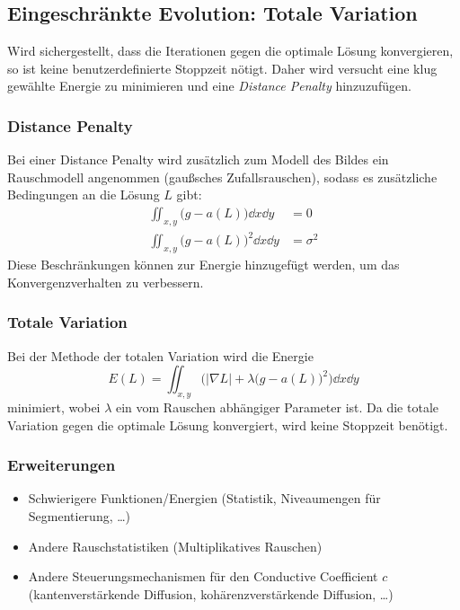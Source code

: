 			\subsection{Eingeschränkte Evolution: Totale Variation}
				Wird sichergestellt, dass die Iterationen gegen die optimale Lösung konvergieren, so ist keine benutzerdefinierte Stoppzeit nötigt. Daher wird versucht eine klug gewählte Energie zu minimieren und eine \emph{Distance Penalty} hinzuzufügen.

				\subsubsection{Distance Penalty}
					Bei einer Distance Penalty wird zusätzlich zum Modell des Bildes ein Rauschmodell angenommen (\zB gaußsches Zufallsrauschen), sodass es zusätzliche Bedingungen an die Lösung \(L\) gibt:
					\begin{align*}
						\iint_{x, y} \! \big( g - a(L) \big) \dd{x} \dd{y}   & = 0        \\
						\iint_{x, y} \! \big( g - a(L) \big)^2 \dd{x} \dd{y} & = \sigma^2
					\end{align*}
					Diese Beschränkungen können zur Energie hinzugefügt werden, um das Konvergenzverhalten zu verbessern.

				\subsubsection{Totale Variation}
					Bei der Methode der totalen Variation wird die Energie
					\begin{equation*}
						E(L) = \iint_{x, y} \! \Big( \lvert \nabla L \rvert + \lambda\big( g - a(L) \big)^2 \Big) \dd{x} \dd{y}
					\end{equation*}
					minimiert, wobei \(\lambda\) ein vom Rauschen abhängiger Parameter ist. Da die totale Variation gegen die optimale Lösung konvergiert, wird keine Stoppzeit benötigt.

				\subsubsection{Erweiterungen}
					\begin{itemize}
						\item Schwierigere Funktionen/Energien (Statistik, Niveaumengen für Segmentierung, \dots)
						\item Andere Rauschstatistiken (\zB Multiplikatives Rauschen)
						\item Andere Steuerungsmechanismen für den Conductive Coefficient \(c\) (\zB kantenverstärkende Diffusion, kohärenzverstärkende Diffusion, \dots)
					\end{itemize}

